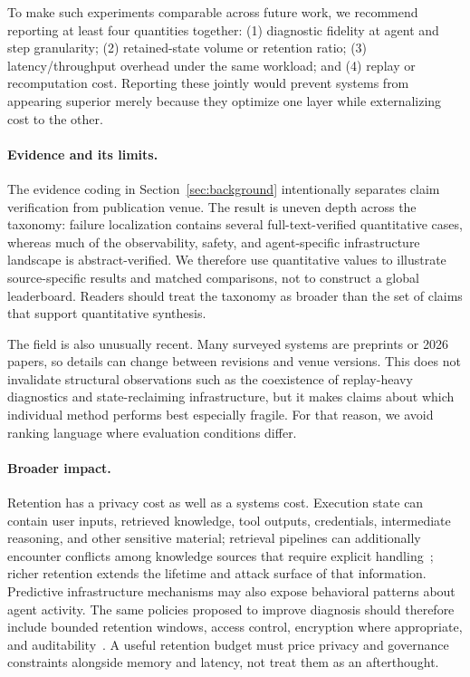 To make such experiments comparable across future work, we recommend reporting at least four quantities together: (1) diagnostic fidelity at agent and step granularity; (2) retained-state volume or retention ratio; (3) latency/throughput overhead under the same workload; and (4) replay or recomputation cost. Reporting these jointly would prevent systems from appearing superior merely because they optimize one layer while externalizing cost to the other.

\paragraph*{Evidence and its limits.}
The evidence coding in Section~\ref{sec:background} intentionally separates claim verification from publication venue. The result is uneven depth across the taxonomy: failure localization contains several full-text-verified quantitative cases, whereas much of the observability, safety, and agent-specific infrastructure landscape is abstract-verified. We therefore use quantitative values to illustrate source-specific results and matched comparisons, not to construct a global leaderboard. Readers should treat the taxonomy as broader than the set of claims that support quantitative synthesis.

The field is also unusually recent. Many surveyed systems are preprints or 2026 papers, so details can change between revisions and venue versions. This does not invalidate structural observations such as the coexistence of replay-heavy diagnostics and state-reclaiming infrastructure, but it makes claims about which individual method performs best especially fragile. For that reason, we avoid ranking language where evaluation conditions differ.

\paragraph*{Broader impact.}
Retention has a privacy cost as well as a systems cost. Execution state can contain user inputs, retrieved knowledge, tool outputs, credentials, intermediate reasoning, and other sensitive material; retrieval pipelines can additionally encounter conflicts among knowledge sources that require explicit handling~\cite{ye2026seeing}; richer retention extends the lifetime and attack surface of that information. Predictive infrastructure mechanisms may also expose behavioral patterns about agent activity. The same policies proposed to improve diagnosis should therefore include bounded retention windows, access control, encryption where appropriate, and auditability~\cite{auditableagents2026}. A useful retention budget must price privacy and governance constraints alongside memory and latency, not treat them as an afterthought.

